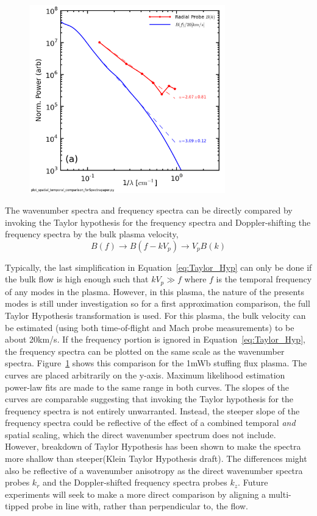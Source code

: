 \documentclass[aip,prl,amsmath,amssymb,reprint,superscriptaddress]{revtex4-1} %
\begin{document}
\begin{figure}[!htbp]
\centerline{
\includegraphics[width=8.5cm]{B_spatial_temporal_comp_wFits_40t60us}}
\caption{\label{fig:wavenumber_comp}}
\end{figure}

The wavenumber spectra and frequency spectra can be directly compared by invoking the Taylor hypothesis for the frequency spectra and Doppler-shifting the frequency spectra by the bulk plasma velocity,
\begin{equation}
B(f) \longrightarrow B(f-kV_{p}) \longrightarrow V_{p}B(k)
\label{eq:Taylor_Hyp}
\end{equation}

Typically, the last simplification in Equation~\ref{eq:Taylor_Hyp} can only be done if the bulk flow is high enough such that $kV_{p} \gg f$ where $f$ is the temporal frequency of any modes in the plasma. However, in this plasma, the nature of the presents modes is still under investigation so for a first approximation comparison, the full Taylor Hypothesis transformation is used. For this plasma, the bulk velocity can be estimated (using both time-of-flight and Mach probe measurements) to be about 20km/s. If the frequency portion is ignored in Equation~\ref{eq:Taylor_Hyp}, the frequency spectra can be plotted on the same scale as the wavenumber spectra. Figure~\ref{fig:wavenumber_comp} shows this comparison for the 1mWb stuffing flux plasma. The curves are placed arbitrarily on the y-axis. Maximum likelihood estimation power-law fits are made to the same range in both curves. The slopes of the curves are comparable suggesting that invoking the Taylor hypothesis for the frequency spectra is not entirely unwarranted. Instead, the steeper slope of the frequency spectra could be reflective of the effect of a combined temporal {\it and} spatial scaling, which the direct wavenumber spectrum does not include. However, breakdown of Taylor Hypothesis has been shown to make the spectra more shallow than steeper(Klein Taylor Hypothesis draft). The differences might also be reflective of a wavenumber anisotropy as the direct wavenumber spectra probes $k_{r}$ and the Doppler-shifted frequency spectra probes $k_{z}$. Future experiments will seek to make a more direct comparison by aligning a multi-tipped probe in line with, rather than perpendicular to, the flow.
\end{document}
